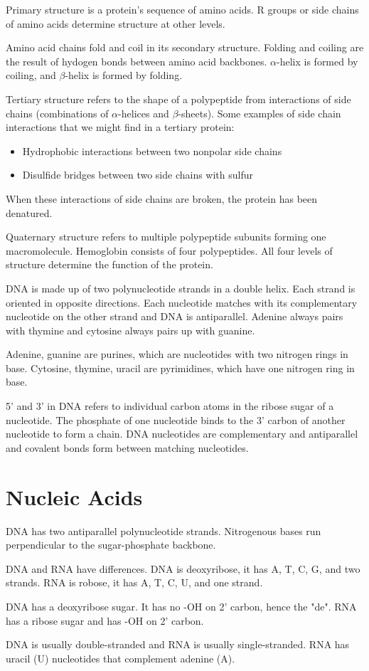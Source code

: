 \documentclass[../bio.tex]{subfiles}
\begin{document}
Primary structure is a protein's sequence of amino acids. R groups or side chains of amino acids determine structure at other levels.

Amino acid chains fold and coil in its secondary structure. Folding and coiling are the result of hydogen bonds between amino acid backbones. $\alpha$-helix is formed by coiling, and $\beta$-helix is formed by folding.

Tertiary structure refers to the shape of a polypeptide from interactions of side chains (combinations of $\alpha$-helices and $\beta$-sheets). Some examples of side chain interactions that we might find in a tertiary protein:
\begin{itemize}
    \item Hydrophobic interactions between two nonpolar side chains
    \item Disulfide bridges between two side chains with sulfur
\end{itemize}
When these interactions of side chains are broken, the protein has been denatured.

Quaternary structure refers to multiple polypeptide subunits forming one macromolecule. Hemoglobin consists of four polypeptides. All four levels of structure determine the function of the protein.

DNA is made up of two polynucleotide strands in a double helix. Each strand is oriented in opposite directions. Each nucleotide matches with its complementary nucleotide on the other strand and DNA is antiparallel. Adenine always pairs with thymine and cytosine always pairs up with guanine.

Adenine, guanine are purines, which are nucleotides with two nitrogen rings in base. Cytosine, thymine, uracil are pyrimidines, which have one nitrogen ring in base.

5' and 3' in DNA refers to individual carbon atoms in the ribose sugar of a nucleotide. The phosphate of one nucleotide binds to the 3' carbon of another nucleotide to form a chain. DNA nucleotides are complementary and antiparallel and covalent bonds form between matching nucleotides.
\section{Nucleic Acids}
DNA has two antiparallel polynucleotide strands. Nitrogenous bases run perpendicular to the sugar-phosphate backbone.

DNA and RNA have differences. DNA is deoxyribose, it has A, T, C, G, and two strands. RNA is robose, it has A, T, C, U, and one strand.

DNA has a deoxyribose sugar. It has no -OH on 2' carbon, hence the "de". RNA has a ribose sugar and has -OH on 2' carbon.

DNA is usually double-stranded and RNA is usually single-stranded. RNA has uracil (U) nucleotides that complement adenine (A).
\end{document}
